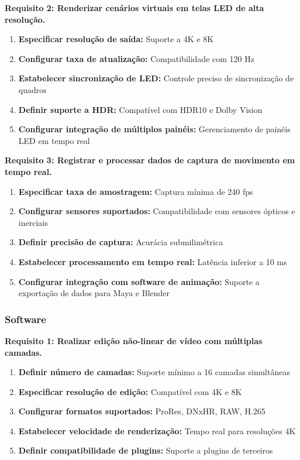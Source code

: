 \textbf{Requisito 2: Renderizar cenários virtuais em telas LED de alta resolução.}
\begin{enumerate}[leftmargin=*]
    \item \textbf{Especificar resolução de saída:} Suporte a 4K e 8K
    \item \textbf{Configurar taxa de atualização:} Compatibilidade com 120 Hz
    \item \textbf{Estabelecer sincronização de LED:} Controle preciso de sincronização de quadros
    \item \textbf{Definir suporte a HDR:} Compatível com HDR10 e Dolby Vision
    \item \textbf{Configurar integração de múltiplos painéis:} Gerenciamento de painéis LED em tempo real
\end{enumerate}

\textbf{Requisito 3: Registrar e processar dados de captura de movimento em tempo real.}
\begin{enumerate}[leftmargin=*]
    \item \textbf{Especificar taxa de amostragem:} Captura mínima de 240 fps
    \item \textbf{Configurar sensores suportados:} Compatibilidade com sensores ópticos e inerciais
    \item \textbf{Definir precisão de captura:} Acurácia submilimétrica
    \item \textbf{Estabelecer processamento em tempo real:} Latência inferior a 10 ms
    \item \textbf{Configurar integração com software de animação:} Suporte a exportação de dados para Maya e Blender
\end{enumerate}

\subsubsection{Software}
\textbf{Requisito 1: Realizar edição não-linear de vídeo com múltiplas camadas.}
\begin{enumerate}[leftmargin=*]
    \item \textbf{Definir número de camadas:} Suporte mínimo a 16 camadas simultâneas
    \item \textbf{Especificar resolução de edição:} Compatível com 4K e 8K
    \item \textbf{Configurar formatos suportados:} ProRes, DNxHR, RAW, H.265
    \item \textbf{Estabelecer velocidade de renderização:} Tempo real para resoluções 4K
    \item \textbf{Definir compatibilidade de plugins:} Suporte a plugins de terceiros
\end{enumerate}

